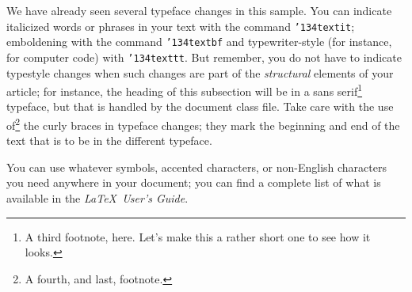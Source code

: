 \documentclass{aamas2012}
\begin{document}
We have already seen several typeface changes in this sample.  You
can indicate italicized words or phrases in your text with
the command \texttt{{\char'134}textit}; emboldening with the
command \texttt{{\char'134}textbf}
and typewriter-style (for instance, for computer code) with
\texttt{{\char'134}texttt}.  But remember, you do not
have to indicate typestyle changes when such changes are
part of the \textit{structural} elements of your
article; for instance, the heading of this subsection will
be in a sans serif\footnote{A third footnote, here.
Let's make this a rather short one to
see how it looks.} typeface, but that is handled by the
document class file. Take care with the use
of\footnote{A fourth, and last, footnote.}
the curly braces in typeface changes; they mark
the beginning and end of
the text that is to be in the different typeface.

You can use whatever symbols, accented characters, or
non-English characters you need anywhere in your document;
you can find a complete list of what is
available in the \textit{\LaTeX\
User's Guide}\cite{Lamport:LaTeX}.
\end{document}
